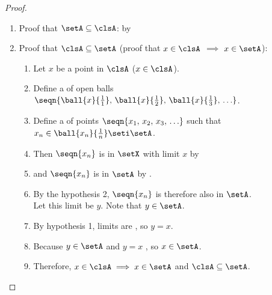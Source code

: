 \begin{proof}
\begin{enumerate}
  \item Proof that $\setA\subseteq\clsA$: by 
  \item Proof that $\clsA\subseteq\setA$ (proof that $x\in\clsA$ $\implies$ $x\in\setA$):
    \begin{enumerate}
      \item Let $x$ be a point in $\clsA$ ($x\in\clsA$).
      \item Define a  of open balls $\seqn{\ball{x}{\frac{1}{1}},\,\ball{x}{\frac{1}{2}},\,\ball{x}{\frac{1}{3}},\,\ldots}$.
      \item Define a  of points $\seqn{x_1,\,x_2,\,x_3,\,\ldots}$ such that $x_n\in\ball{x_n}{\frac{1}{n}}\seti\setA$.
      \item Then $\seqn{x_n}$ is  in $\setX$ with limit $x$ by 
      \item and  $\seqn{x_n}$ is  in $\setA$ by .
      \item By the hypothesis 2, $\seqn{x_n}$ is therefore also  in $\setA$.\\
            Let this limit be $y$. Note that $y\in\setA$.\label{item:com_cls_yY}
      \item By hypothesis 1, limits are , so $y=x$. \label{item:com_cls_yx}
      \item Because $y\in\setA$  and $y=x$ , so $x\in\setA$.
      \item Therefore, $x\in\clsA\implies x\in\setA$ and $\clsA\subseteq\setA$.
    \end{enumerate}
\end{enumerate}
\end{proof}

